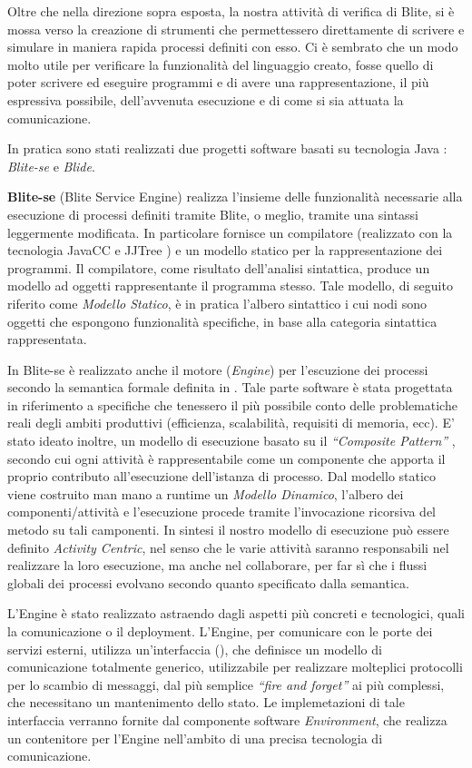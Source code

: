 Oltre che nella direzione sopra esposta, la nostra attività di verifica di
Blite, si è mossa verso la creazione di strumenti che permettessero
direttamente di scrivere e simulare in maniera rapida processi definiti con
esso. Ci è sembrato che un modo molto utile per verificare la funzionalità del
linguaggio creato, fosse quello di poter scrivere ed eseguire programmi e di avere una
rappresentazione, il più espressiva possibile, dell'avvenuta esecuzione e di
come si sia attuata la comunicazione.

In pratica sono stati realizzati due progetti software basati su tecnologia
Java \cite{Java}: \emph{Blite-se} e \emph{Blide}. 

\textbf{Blite-se} (Blite Service Engine) realizza l'insieme delle funzionalità
necessarie alla esecuzione di processi definiti tramite Blite, o meglio, tramite
una sintassi leggermente modificata. In particolare fornisce un compilatore
(realizzato con la tecnologia JavaCC e JJTree \cite{JavaCC}) e un modello
statico per la rappresentazione dei programmi. Il compilatore, come risultato
dell'analisi sintattica, produce un modello ad oggetti rappresentante il programma stesso.
Tale modello, di seguito riferito come \emph{Modello Statico}, è in pratica
l'albero sintattico i cui nodi sono oggetti che espongono funzionalità
specifiche, in base alla categoria sintattica rappresentata.

In Blite-se è realizzato anche il motore (\emph{Engine}) per l'escuzione dei
processi secondo la semantica formale definita in \cite{LaPuTie1}. Tale parte software
è stata progettata in riferimento a specifiche che tenessero il più possibile
conto delle problematiche reali degli ambiti produttivi (efficienza,
scalabilità, requisiti di memoria, ecc). E' stato ideato inoltre, un modello di
esecuzione basato su il \emph{``Composite Pattern''} \cite{GANGo4}, secondo cui ogni attività è
rappresentabile come un componente che apporta il proprio contributo
all'esecuzione dell'istanza di processo. Dal modello statico viene costruito man
mano a runtime un \emph{Modello Dinamico}, l'albero dei componenti/attività e
l'esecuzione procede tramite l'invocazione ricorsiva del metodo
 su tali camponenti. In sintesi il nostro modello di
esecuzione può essere definito \emph{Activity Centric}, nel senso che le varie
attività saranno responsabili nel realizzare la loro esecuzione, ma anche nel
collaborare, per far sì che i flussi globali dei processi evolvano secondo
quanto specificato dalla semantica.

L'Engine è stato realizzato astraendo dagli aspetti più concreti e
tecnologici, quali la comunicazione o il deployment. L'Engine, per comunicare
con le porte dei servizi esterni, utilizza un'interfaccia
(), che definisce un modello di comunicazione totalmente
generico, utilizzabile per realizzare molteplici protocolli per lo scambio di
messaggi, dal più semplice \emph{``fire and forget''} ai più complessi, che necessitano un
mantenimento dello stato. Le implemetazioni di tale interfaccia verranno fornite
dal componente software \emph{Environment}, che realizza un contenitore per
l'Engine nell'ambito di una precisa tecnologia di comunicazione. 

